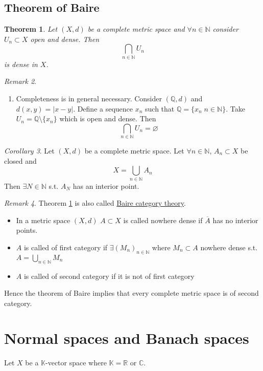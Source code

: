 \documentclass[a4paper, 12pt]{article}
\theoremstyle{plain}
\newtheorem{theorem}{Theorem}[subsection] %
\theoremstyle{definition}
\theoremstyle{lemma}
\theoremstyle{remark}
\newtheorem{remark}[theorem]{Remark}
\theoremstyle{corollary}
\newtheorem{corollary}[theorem]{Corollary}
\theoremstyle{example}
\begin{document}
	\subsection{Theorem of Baire}
	\begin{theorem}
		\label{th: baire}
		Let $(X,d)$ be a complete metric space and $\forall n \in \mathbb{N}$ consider $U_n \subset X$ open and dense. Then \[\bigcap\limits_{n \in \mathbb{N}} U_n\] is dense in $X$.
	\end{theorem}
	
	\begin{remark}
		\begin{enumerate}
			\item Completeness is in general necessary. Consider $(\mathbb{Q}, d)$ and $d(x,y) = \left|x-y\right|$. Define a sequence $x_n$ such that $\mathbb{Q} = \{x_n \; n \in \mathbb{N}\}$. Take $U_n = \mathbb{Q} \setminus \{x_n\}$ which is open and dense. Then \[\bigcap\limits_{n \in \mathbb{N}} U_n = \varnothing\]
		\end{enumerate}
	\end{remark}
	
	\begin{corollary}
		Let $(X,d)$ be a complete metric space. Let $\forall n \in \mathbb{N}$, $A_n \subset X$ be closed and \[X = \bigcup\limits_{n \in \mathbb{N}} A_n\] Then $\exists N \in \mathbb{N}$ s.t. $A_N$ has an interior point.
	\end{corollary}
	
	\begin{remark}
		Theorem \ref{th: baire} is also called \underline{Baire category theory}.\\
		\begin{itemize}
			\item In a metric space $(X,d)$ $A \subset X$ is called nowhere dense if $\overline{A}$ has no interior points.
			\item $A$ is called of first category if $\exists (M_n)_{n \in \mathbb{N}}$ where $M_n \subset A$ nowhere dense s.t. $A = \bigcup_{n \in \mathbb{N}} M_n$
			\item $A$ is called of second category if it is not of first category
		\end{itemize}
		Hence the theorem of Baire implies that every complete metric space is of second category.
	\end{remark}
	
	\section{Normal spaces and Banach spaces}
	Let $X$ be a $\mathbb{K}$-vector space where $\mathbb{K} = \mathbb{R}$ or $\mathbb{C}$.
\end{document}
